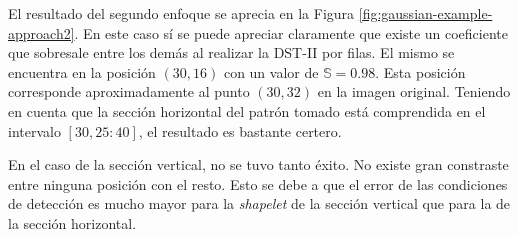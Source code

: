 El resultado del segundo enfoque se aprecia en la Figura \ref{fig:gaussian-example-approach2}.
En este caso sí se puede apreciar claramente que existe un coeficiente que sobresale
entre los demás al realizar la DST-II por filas. El mismo se encuentra en la posición $(30,16)$ con un valor de $\mathbb{S}=0.98$.
Esta posición corresponde aproximadamente al punto $(30,32)$ en la imagen original. Teniendo en cuenta que la
sección horizontal del patrón tomado está comprendida en el intervalo $[30,25:40]$, el resultado es bastante certero.

En el caso de la sección vertical, no se tuvo tanto éxito. No existe gran constraste entre ninguna posición con el resto. 
Esto se debe a que el error de las condiciones de detección es mucho mayor para la \textit{shapelet} de la sección
vertical que para la de la sección horizontal.

